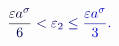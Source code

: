 \documentclass[12pt]{article}
\begin{document}
\makeatletter
\renewcommand*{\@textcolor}[3]{%
  \protect\leavevmode
  \begingroup
    \color#1{#2}#3%
  \endgroup
}
\makeatother
\begin{displaymath}
\mathcolor[RGB]{0,0,15}{\frac { \mathcolor[RGB]{0,0,30}{\varepsilon} \mathcolor[RGB]{0,0,45}{a} ^ { \mathcolor[RGB]{0,0,60}{\sigma} } } { \mathcolor[RGB]{0,0,75}{6} } } \mathcolor[RGB]{0,0,90}{<} \mathcolor[RGB]{0,0,105}{\varepsilon} _ { \mathcolor[RGB]{0,0,120}{2} } \mathcolor[RGB]{0,0,135}{\le} \mathcolor[RGB]{0,0,150}{\frac { \mathcolor[RGB]{0,0,165}{\varepsilon} \mathcolor[RGB]{0,0,180}{a} ^ { \mathcolor[RGB]{0,0,195}{\sigma} } } { \mathcolor[RGB]{0,0,210}{3} } } \mathcolor[RGB]{0,0,225}{.}
\end{displaymath}
\end{document}

